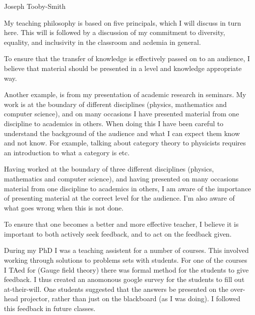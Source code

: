 \documentclass[12pt,letter]{article}
\newcounter{customtitle}
\begin{document}
\vspace{-1cm}
\begin{flushright}
{{\Large \color{white}Joseph Tooby-Smith}}
\end{flushright}
\vspace{0.4cm}

My teaching philosophy is based on five principals, which I will discuss in turn here. This will is followed by a discussion of my commitment to diversity, equality, and inclusivity in the classroom and acdemia in general.
 
 
 To ensure that the transfer of knowledge is effectively passed on to an audience, I believe that material should be presented in a level and knowledge appropriate way. 
 
 
 Another example, is from my presentation of academic research in seminars. My work is at the boundary of different disciplines (physics, mathematics and computer science), and on many occasions I have presented material from one  discipline to academics in others. When doing this I have been careful to understand the background of the audience and what I can expect them know and not know. For example, talking about category theory to physicists requires an introduction to what a category is etc.
 
 
  Having worked at the boundary of 
three different disciplines (physics, mathematics and computer science), and having 
presented on many occasions material from one  discipline to academics in others, 
I am aware of the importance of presenting material at the correct level for the audience.
I'm also aware of what goes wrong when this is not done. 


 To ensure that one becomes a better and more effective teacher, I believe it is important to both actively seek feedback, and to act on the feedback given. 
 
 During my PhD I was a teaching assistent for a number of courses. This involved working through solutions to problems sets with students. For one of the courses I TAed for (Gauge field theory) there was formal method for the students to give feedback. I thus created an anomonous google survey for the students to fill out at-their-will. One students suggested that the answers be presented on the over-head projector, rather than just on the blackboard (as I was doing). I followed this feedback in future classes.
 
\end{document}
